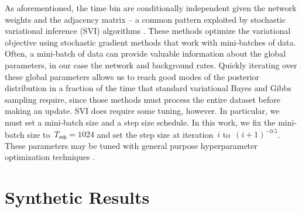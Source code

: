 As aforementioned, the time bin are conditionally independent given the network weights and the adjacency matrix -- a common pattern exploited by stochastic variational inference (SVI) algorithms \cite{Hoffman-2013}.
These methods optimize the variational objective using stochastic gradient methods that work with mini-batches of data.
Often, a mini-batch of data can provide valuable information about the global parameters, in our case the network and background rates. 
Quickly iterating over these global parameters allows us to reach good modes of the posterior distribution in a fraction of the time that standard variational Bayes and Gibbs sampling require, since those methods must process the entire dataset before making an update.
SVI does require some tuning, however. In particular, we must set a mini-batch size and a step size schedule.
In this work, we fix the mini-batch size to~${T_{\mathsf{mb}}=1024}$ and set the  step size at iteration~$i$ to~${(i+1)^{-0.5}}$.
These parameters may be  tuned with general purpose hyperparameter optimization techniques \cite{Snoek-2012}.

\section{Synthetic Results}

